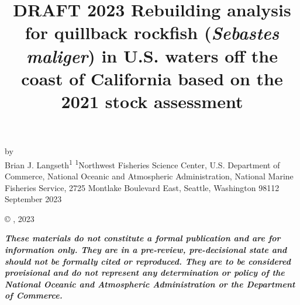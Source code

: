 \documentclass[11pt,
  letterpaper,
]{article}
\date{}
\newcommand{\trTitle}{DRAFT 2023 Rebuilding analysis for quillback rockfish (\emph{Sebastes maliger}) in U.S. waters off the coast of California based on the 2021 stock assessment}
\newcommand{\trYear}{2023}
\newcommand{\trMonth}{September}
\newcommand\includegraphicsifexists[2][width=\linewidth]{\IfFileExists{#2}{\texttt{[image: \#2]}}{}}
\begin{document}

\renewcommand*{\thefootnote}{\fnsymbol{footnote}}

\small
\thispagestyle{empty}
\noindent
\begin{center}
\title{DRAFT 2023 Rebuilding analysis for quillback rockfish (\emph{Sebastes maliger}) in U.S. waters off the coast of California based on the 2021 stock assessment}
\vspace{1.5cm}
{\Large\textbf{}}

\includegraphicsifexists[width=4in]{figure_title.png}
\vfill
by\\
Brian J. Langseth\textsuperscript{1}\vfill
\textsuperscript{1}Northwest Fisheries Science Center, U.S. Department of Commerce, National Oceanic and Atmospheric Administration, National Marine Fisheries Service, 2725 Montlake Boulevard East, Seattle, Washington 98112\vfill
\trMonth{} \trYear{}
\end{center}
\clearpage

\thispagestyle{empty}
\vspace*{\fill}
\begin{center}
\copyright{} , \trYear{}\\
\end{center}
\par
\bigskip
\noindent
\bigskip
\par
\textbf{\textit{These materials do not constitute a formal publication and are for
information only. They are in a pre-review, pre-decisional state and
should not be formally cited or reproduced. They are to be considered
provisional and do not represent any determination or policy of the
National Oceanic and Atmospheric Administration or the Department of
Commerce.}}

\clearpage


\tableofcontents\clearpage
\label{TRlastRoman}
\clearpage

\newpage
\thispagestyle{empty} %
\end{document}

